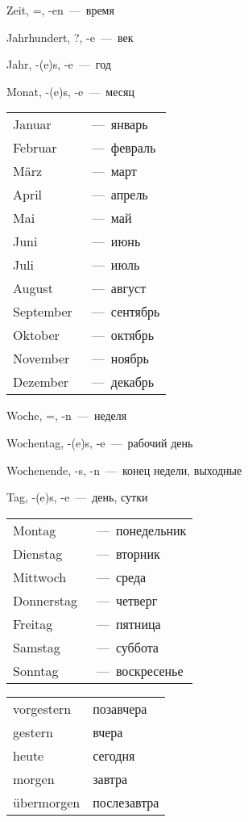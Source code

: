 
 Zeit, =, -en~---~время

 Jahrhundert, ?, -e~---~век

 Jahr, -(e)s, -e~---~год

 Monat, -(e)s, -e~---~месяц

\begin{tabular}{ll}
Januar & ~---~январь \\
Februar & ~---~февраль \\
M\" arz & ~---~март \\
April & ~---~апрель \\
Mai & ~---~май \\
Juni & ~---~июнь \\
Juli & ~---~июль \\
August & ~---~август \\
September & ~---~сентябрь \\
Oktober & ~---~октябрь \\
November & ~---~ноябрь \\
Dezember & ~---~декабрь
\end{tabular}

 Woche, =, -n~---~неделя

 Wochentag, -(e)s, -e~---~рабочий день

 Wochenende, -s, -n~---~конец недели, выходные

 Tag, -(e)s, -e~---~день, сутки
 
\begin{tabular}{ll}
Montag & ~---~понедельник \\
Dienstag & ~---~вторник \\
Mittwoch & ~---~среда \\
Donnerstag & ~---~четверг \\
Freitag & ~---~пятница \\
Samstag & ~---~суббота \\
Sonntag & ~---~воскресенье
\end{tabular}

\begin{tabular}{ll}
vorgestern & позавчера \\
gestern & вчера \\
heute & сегодня \\
morgen & завтра \\
\"ubermorgen & послезавтра \\
\end{tabular}
